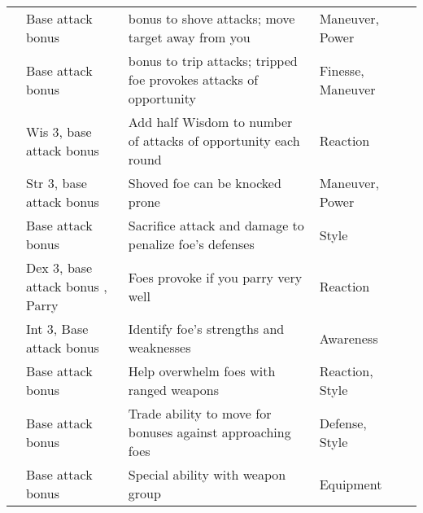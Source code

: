 {\begin{longtabu}{>{\lcol}p{10em} >{\lcol}p{15em} >{\lcol}X >{\lcol}p{6em} >{\lcol}p{3em}}
         & Base attack bonus  &  bonus to shove attacks; move target away from you & Maneuver, Power &  \\
         & Base attack bonus  &  bonus to trip attacks; tripped foe provokes attacks of opportunity & Finesse, Maneuver &  \\
         & Wis 3, base attack bonus  & Add half Wisdom to number of attacks of opportunity each round & Reaction &  \\
         & Str 3, base attack bonus  & Shoved foe can be knocked prone & Maneuver, Power &  \\
         & Base attack bonus  & Sacrifice attack and damage to penalize foe's defenses & Style &  \\
         & Dex 3, base attack bonus , Parry & Foes provoke if you parry very well & Reaction &  \\
         & Int 3, Base attack bonus  & Identify foe's strengths and weaknesses & Awareness &  \\
         & Base attack bonus  & Help overwhelm foes with ranged weapons & Reaction, Style &  \\
         & Base attack bonus  & Trade ability to move for bonuses against approaching foes & Defense, Style &  \\
         & Base attack bonus  & Special ability with weapon group & Equipment &  \\


\end{longtabu}}
